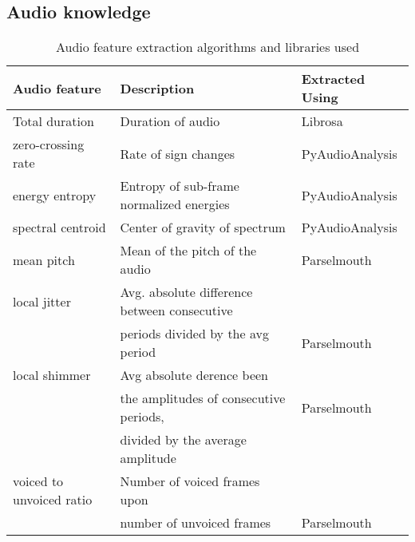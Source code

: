 \documentclass[sigconf]{acmart}
\begin{document}

\subsection{Audio knowledge}
\label{subsec:Audio Features}


\begin{table*}[]
\begin{tabular}{@{}|l|l|l|@{}}  \toprule
\textbf{Audio feature} & \textbf{Description} & \textbf{Extracted Using}\\ \midrule \midrule
Total duration & Duration of audio &  Librosa \cite{mcfee2015librosa}\\ \midrule
zero-crossing rate & Rate of sign changes & PyAudioAnalysis \cite{giannakopoulos2015pyaudioanalysis}\\ \midrule
energy entropy & Entropy of sub-frame normalized energies & PyAudioAnalysis \cite{giannakopoulos2015pyaudioanalysis} \\\midrule
spectral centroid & Center of gravity of spectrum & PyAudioAnalysis \cite{giannakopoulos2015pyaudioanalysis} \\\midrule
mean pitch & Mean of the pitch of the audio &  Parselmouth \cite{parselmouth,praat}\\ \midrule
local jitter & Avg. absolute difference between consecutive\\  & periods divided by the avg period & Parselmouth \cite{parselmouth,praat}\\ \midrule
local shimmer & Avg absolute derence been\\ & the amplitudes of consecutive periods, & Parselmouth \cite{parselmouth,praat}\\ & divided by the average amplitude &  \\ \midrule
voiced to unvoiced ratio & Number of voiced frames upon\\ & number of unvoiced frames & Parselmouth \cite{parselmouth,praat}\\ \bottomrule
\end{tabular}
\caption{ \label{table: audio feature extraction}Audio feature extraction algorithms and libraries used}
\end{table*}
\end{document}
